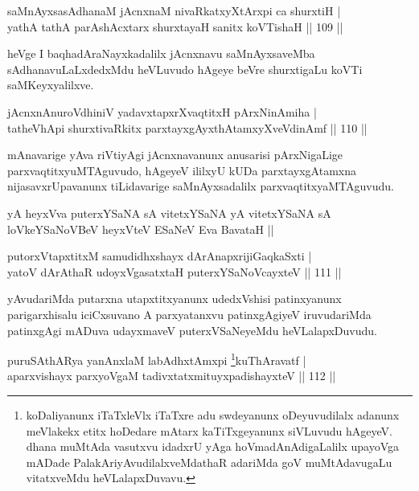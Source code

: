 \begin{shl}
saMnAyxsasAdhanaM jAcnxnaM nivaRkatxyXtArxpi ca shurxtiH |\\
yathA tathA parAshAcxtarx shurxtayaH sanitx koVTishaH \hfill || 109 ||
\end{shl}

\begin{artha}%
heVge I baqhadAraNayxkadalilx jAcnxnavu saMnAyxsaveMba sAdhanavuLaLxdedxMdu heVLuvudo hAgeye beVre shurxtigaLu koVTi saMKeyxyalilxve.
\end{artha}

\begin{shl}
jAcnxnAnuroVdhiniV yadavxtapxrXvaqtitxH pArxNinAmiha |\\
tatheVhApi shurxtivaRkitx parxtayxgAyxthAtamxyXveVdinAmf \hfill || 110 ||
\end{shl}

\begin{artha}
mAnavarige yAva riVtiyAgi jAcnxnavanunx anusarisi pArxNigaLige parxvaqtitxyuMTAguvudo, hAgeyeV ililxyU kUDa parxtayxgAtamxna nijasavxrUpavanunx tiLidavarige saMnAyxsadalilx parxvaqtitxyaMTAguvudu.
\end{artha}

\begin{shl}
yA heyxVva puterxYSaNA sA vitetxYSaNA yA vitetxYSaNA sA loVkeYSaNoVBeV heyxVteV ESaNeV Eva BavataH ||
\end{shl}


\begin{shl}
putorxVtapxtitxM samudidhxshayx dArAnapxrijiGaqkaSxti |\\
yatoV dArAthaR udoyxVgasatxtaH puterxYSaNoVcayxteV \hfill || 111 ||
\end{shl}

\begin{artha}
yAvudariMda putarxna utapxtitxyanunx udedxVshisi patinxyanunx parigarxhisalu iciCxsuvano A parxyatanxvu patinxgAgiyeV  iruvudariMda patinxgAgi mADuva udayxmaveV puterxVSaNeyeMdu heVLalapxDuvudu. 
\end{artha}

 
\begin{shl}
puruSAthARya yanAnxlaM labAdhxtAmx\s pi \footnote{koDaliyanunx iTaTxleVlx iTaTxre adu swdeyanunx oDeyuvudilalx adanunx meVlakekx etitx hoDedare mAtarx kaTiTxgeyanunx siVLuvudu hAgeyeV. dhana muMtAda vasutxvu idadxrU yAga hoVmadAnAdigaLalilx upayoVga mADade PalakAriyAvudilalxveMdathaR adariMda goV muMtAdavugaLu vitatxveMdu heVLalapxDuvavu.}kuThAravatf |\\
aparxvishayx parxyoVgaM tadivxtatxmituyxpadishayxteV \hfill || 112 ||
\end{shl}

